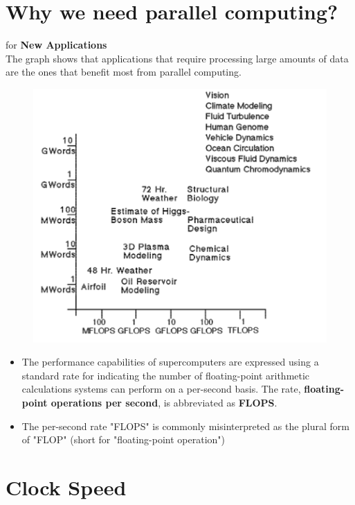 \documentclass[12pt, a4paper]{book}
\begin{document}
\section{Why we need parallel computing?}
for \textbf{New Applications} \\
The graph shows that applications that require processing large amounts of data are the ones that benefit most from parallel computing.
\begin{figure}[!h]
    \centering
    \includegraphics[width=0.7\linewidth]{figures/new-applications.png}
\end{figure}
\begin{itemize}
    \item The performance capabilities of supercomputers are expressed using a standard rate for indicating the number of floating-point arithmetic calculations systems can perform on a per-second basis. The rate, \textbf{floating-point operations per second}, is abbreviated as \textbf{FLOPS}.
    \item The per-second rate "FLOPS" is commonly misinterpreted as the plural form of "FLOP" (short for "floating-point operation") \cite{flops}
\end{itemize}
\section{Clock Speed}
\end{document}
